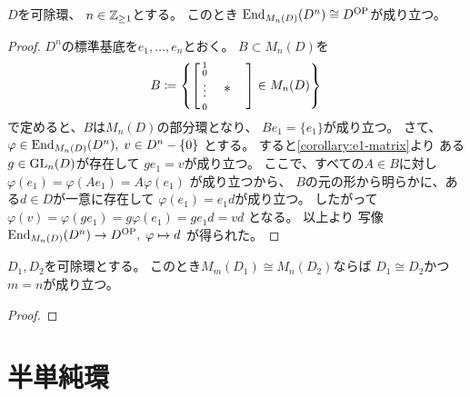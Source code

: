 \documentclass[report]{jlreq}
\begin{document}

\begin{lemma}
    $D$を可除環、
    $n \in \mathbb{Z}_{\ge 1}$とする。
    このとき
    $\operatorname{End}_{M_n(D)}(D^n) \cong D^{\mathrm{OP}}$が成り立つ。
\end{lemma}

\begin{proof}
    $D^n$の標準基底を$e_1, \dots, e_n$とおく。
    $B \subset M_n(D)$を
    \begin{equation}
        B \coloneqq \left\{
            \left[\begin{smallmatrix}
                1 \\
                0 \\
                \vdots & \quad \text{\large *} \quad \\[1ex]
                0
            \end{smallmatrix}\right]
            \in M_n(D)
        \right\}
    \end{equation}
    で定めると、$B$は$M_n(D)$の部分環となり、
    $Be_1 = \{ e_1 \}$が成り立つ。
    さて、$\varphi \in \operatorname{End}_{M_n(D)}(D^n), \;
        v \in D^n - \{ 0 \}$
    とする。
    すると\cref{corollary:e1-matrix}より
    ある$g \in \operatorname{\mathrm{GL}}_n(D)$が存在して
    $ge_1 = v$が成り立つ。
    ここで、すべての$A \in B$に対し
    $\varphi(e_1) = \varphi(Ae_1) = A\varphi(e_1)$
    が成り立つから、
    $B$の元の形から明らかに、ある$d \in D$が一意に存在して
    $\varphi(e_1) = e_1 d$が成り立つ。
    したがって
    $\varphi(v) = \varphi(ge_1) = g\varphi(e_1) = ge_1d = vd$
    となる。
    以上より
    写像$\operatorname{End}_{M_n(D)}(D^n) \to D^{\mathrm{OP}}, \; \varphi \mapsto d$
    が得られた。
    \TODO{}
\end{proof}

\begin{theorem}
    $D_1, D_2$を可除環とする。
    このとき$M_m(D_1) \cong M_n(D_2)$ならば
    $D_1 \cong D_2$かつ$m = n$が成り立つ。
\end{theorem}

\begin{proof}
    \TODO{}
\end{proof}



%
\section{半単純環}
\end{document}
